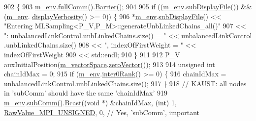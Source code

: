 \begin{DoxyCode}
902 \{
903   \hyperlink{class_q_u_e_s_o_1_1_m_l_sampling_a13f1ca4fe9f94822fe572a743eaced1d}{m\_env}.\hyperlink{class_q_u_e_s_o_1_1_base_environment_a0b0779b41ff304058856e97e1d16b4d4}{fullComm}().\hyperlink{class_q_u_e_s_o_1_1_mpi_comm_a4059971c30e023b272fccaa6aa00c426}{Barrier}();
904 
905   \textcolor{keywordflow}{if} ((\hyperlink{class_q_u_e_s_o_1_1_m_l_sampling_a13f1ca4fe9f94822fe572a743eaced1d}{m\_env}.\hyperlink{class_q_u_e_s_o_1_1_base_environment_a8a0064746ae8dddfece4229b9ad374d6}{subDisplayFile}()) && (\hyperlink{class_q_u_e_s_o_1_1_m_l_sampling_a13f1ca4fe9f94822fe572a743eaced1d}{m\_env}.
      \hyperlink{class_q_u_e_s_o_1_1_base_environment_a1fe5f244fc0316a0ab3e37463f108b96}{displayVerbosity}() >= 0)) \{
906     *\hyperlink{class_q_u_e_s_o_1_1_m_l_sampling_a13f1ca4fe9f94822fe572a743eaced1d}{m\_env}.\hyperlink{class_q_u_e_s_o_1_1_base_environment_a8a0064746ae8dddfece4229b9ad374d6}{subDisplayFile}() << \textcolor{stringliteral}{"Entering
       MLSampling<P\_V,P\_M>::generateUnbLinkedChains\_all()"}
907                             << \textcolor{stringliteral}{": unbalancedLinkControl.unbLinkedChains.size() = "} << unbalancedLinkControl
      .unbLinkedChains.size()
908                             << \textcolor{stringliteral}{", indexOfFirstWeight = "}                           << indexOfFirstWeight
909                             << std::endl;
910   \}
911 
912   P\_V auxInitialPosition(\hyperlink{class_q_u_e_s_o_1_1_m_l_sampling_a7bc4c72f65ba9166ed94a6e198b0915b}{m\_vectorSpace}.\hyperlink{class_q_u_e_s_o_1_1_vector_space_a92e963bb5cab3eecd290dfe4b8f03b04}{zeroVector}());
913 
914   \textcolor{keywordtype}{unsigned} \textcolor{keywordtype}{int} chainIdMax = 0;
915   \textcolor{keywordflow}{if} (\hyperlink{class_q_u_e_s_o_1_1_m_l_sampling_a13f1ca4fe9f94822fe572a743eaced1d}{m\_env}.\hyperlink{class_q_u_e_s_o_1_1_base_environment_ae106b5bb8a80b655b88b3a26b1e7c185}{inter0Rank}() >= 0) \{
916     chainIdMax = unbalancedLinkControl.unbLinkedChains.size();
917   \}
918   \textcolor{comment}{// KAUST: all nodes in 'subComm' should have the same 'chainIdMax'}
919   \hyperlink{class_q_u_e_s_o_1_1_m_l_sampling_a13f1ca4fe9f94822fe572a743eaced1d}{m\_env}.\hyperlink{class_q_u_e_s_o_1_1_base_environment_affe39f53e3d5d678842413370af09145}{subComm}().\hyperlink{class_q_u_e_s_o_1_1_mpi_comm_abd6af8db8b0c7fd2f5b62e26477a9537}{Bcast}((\textcolor{keywordtype}{void} *) &chainIdMax, (\textcolor{keywordtype}{int}) 1, 
      \hyperlink{_mpi_comm_8h_a06cbfbc33436f6e0dc8a48ff3c49bdfc}{RawValue\_MPI\_UNSIGNED}, 0, \textcolor{comment}{// Yes, 'subComm', important}

\end{DoxyCode}
